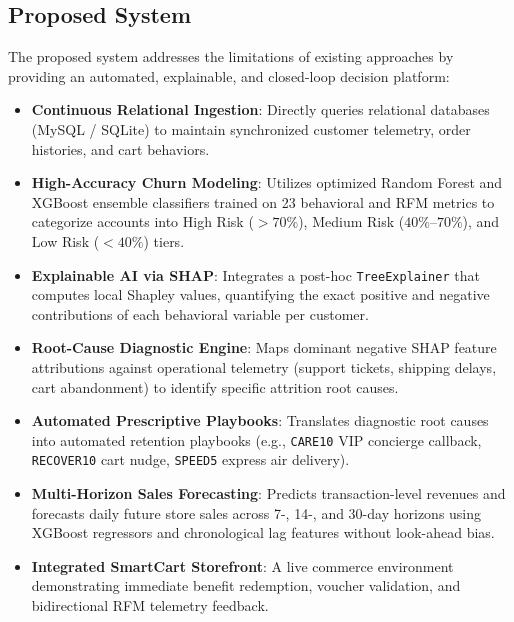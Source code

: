 \documentclass[12pt,a4paper]{article}
\begin{document}
\subsection{Proposed System}\label{sub:1.4}

The proposed system addresses the limitations of existing approaches by providing an automated, explainable, and closed-loop decision platform:
\begin{itemize}[leftmargin=20pt]
    \item \textbf{Continuous Relational Ingestion}: Directly queries relational databases (MySQL / SQLite) to maintain synchronized customer telemetry, order histories, and cart behaviors.
    \item \textbf{High-Accuracy Churn Modeling}: Utilizes optimized Random Forest and XGBoost ensemble classifiers trained on 23 behavioral and RFM metrics to categorize accounts into High Risk ($>70\%$), Medium Risk ($40\%$--$70\%$), and Low Risk ($<40\%$) tiers.
    \item \textbf{Explainable AI via SHAP}: Integrates a post-hoc \texttt{TreeExplainer} that computes local Shapley values, quantifying the exact positive and negative contributions of each behavioral variable per customer.
    \item \textbf{Root-Cause Diagnostic Engine}: Maps dominant negative SHAP feature attributions against operational telemetry (support tickets, shipping delays, cart abandonment) to identify specific attrition root causes.
    \item \textbf{Automated Prescriptive Playbooks}: Translates diagnostic root causes into automated retention playbooks (e.g., \texttt{CARE10} VIP concierge callback, \texttt{RECOVER10} cart nudge, \texttt{SPEED5} express air delivery).
    \item \textbf{Multi-Horizon Sales Forecasting}: Predicts transaction-level revenues and forecasts daily future store sales across 7-, 14-, and 30-day horizons using XGBoost regressors and chronological lag features without look-ahead bias.
    \item \textbf{Integrated SmartCart Storefront}: A live commerce environment demonstrating immediate benefit redemption, voucher validation, and bidirectional RFM telemetry feedback.
\end{itemize}
\end{document}
